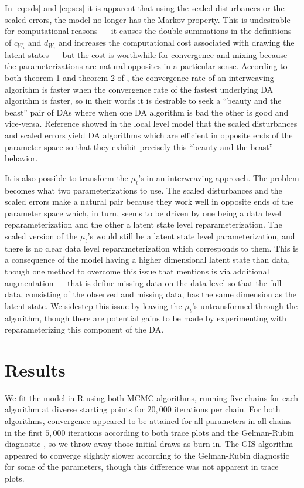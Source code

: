 \documentclass[graybox]{svmult}
\begin{document}
In \eqref{eq:sds} and \eqref{eq:ses} it is apparent that using the scaled disturbances or the scaled errors, the model no longer has the Markov property. This is undesirable for computational reasons --- it causes the double summations in the definitions of $c_{W_i}$ and $d_{W_i}$ and increases the computational cost associated with drawing the latent states --- but the cost is worthwhile for convergence and mixing because the parameterizations are natural opposites in a particular sense. According to both theorem 1 and theorem 2 of \cite{yu2011center}, the convergence rate of an interweaving algorithm is faster when the convergence rate of the fastest underlying DA algorithm is faster, so in their words it is desirable to seek a ``beauty and the beast'' pair of DAs where when one DA algorithm is bad the other is good and vice-versa. Reference \cite{simpson2014interweaving} showed in the local level model that the scaled disturbances and scaled errors yield DA algorithms which are efficient in opposite ends of the parameter space so that they exhibit precisely this ``beauty and the beast'' behavior.

It is also possible to transform the $\mu_t$'s in an interweaving approach. The problem becomes what two parameterizations to use. The scaled disturbances and the scaled errors make a natural pair because they work well in opposite ends of the parameter space which, in turn, seems to be driven by one being a data level reparameterization and the other a latent state level reparameterization. The scaled version of the $\mu_t$'s would still be a latent state level parameterization, and there is no clear data level reparameterization which corresponds to them. This is a consequence of the model having a higher dimensional latent state than data, though one method to overcome this issue that \cite{simpson2014interweaving} mentions is via additional augmentation --- that is define missing data on the data level so that the full data, consisting of the observed and missing data, has the same dimension as the latent state. We sidestep this issue by leaving the $\mu_t$'s untransformed through the algorithm, though there are potential gains to be made by experimenting with reparameterizing this component of the DA.

\section{Results}\label{sec:results}

We fit the model in R using both MCMC algorithms, running five chains for each algorithm at diverse starting points for $20,000$ iterations per chain. For both algorithms, convergence appeared to be attained for all parameters in all chains in the first $5,000$ iterations according to both trace plots and the Gelman-Rubin diagnostic \citep{brooks1998general}, so we throw away those initial draws as burn in. The GIS algorithm appeared to converge slightly slower according to the Gelman-Rubin diagnostic for some of the parameters, though this difference was not apparent in trace plots. 
\end{document}
